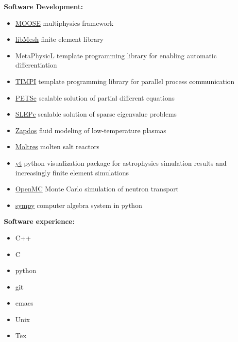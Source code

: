 \documentclass[a4paper,10pt]{article} %
\begin{document}
\textbf{Software Development:}
\begin{itemize}[noitemsep]
\item \href{https://github.com/idaholab/moose}{MOOSE} multiphysics framework
\item \href{https://github.com/libmesh/libmesh}{libMesh} finite element library
\item \href{https://github.com/libmesh/metaphysicl}{MetaPhysicL} template
  programming library for enabling automatic differentiation
\item \href{https://github.com/libmesh/timpi}{TIMPI} template programming
  library for parallel process communication
\item \href{https://gitlab.com/petsc/petsc}{PETSc} scalable solution of partial
  different equations
\item \href{https://gitlab.com/slepc/slepc}{SLEPc} scalable solution of sparse
  eigenvalue problems
\item \href{https://github.com/shannon-lab/zapdos}{Zapdos} fluid modeling of low-temperature plasmas
\item \href{https://github.com/arfc/moltres}{Moltres} molten salt reactors
\item \href{https://bitbucket.org/yt/yt\_analysis}{yt} python visualization package for astrophysics simulation results and increasingly finite element simulations
\item \href{https://github.com/mit-crpg/openmc}{OpenMC} Monte Carlo simulation of neutron transport
\item \href{https://github.com/sympy/sympy}{sympy} computer algebra system in python
\end{itemize}

\textbf{Software experience:}
\begin{itemize}[noitemsep]
\item C++
\item C
\item python
\item git
\item emacs
\item Unix
\item Tex
\end{itemize}



\end{document}
